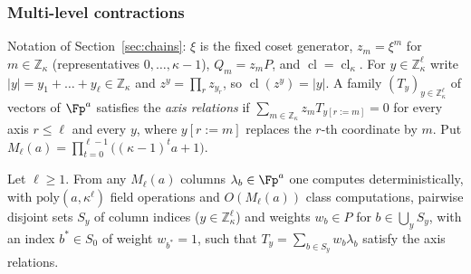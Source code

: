 
\subsubsection*{Multi-level contractions}

Notation of Section~\ref{sec:chains}: $\xi$ is the fixed coset generator, $z_m = \xi^m$ for $m \in \mathbb{Z}_\kappa$ (representatives $0,\dots,\kappa-1$), $Q_m = z_mP$, and $\operatorname{cl} = \operatorname{cl}_\kappa$. For $y \in \mathbb{Z}_\kappa^\ell$ write $|y| = y_1 + \dots + y_\ell \in \mathbb{Z}_\kappa$ and $z^y = \prod_r z_{y_r}$, so $\operatorname{cl}(z^y) = |y|$. A family $(T_y)_{y \in \mathbb{Z}_\kappa^\ell}$ of vectors of $\Fp^a$ satisfies the \emph{axis relations} if $\sum_{m \in \mathbb{Z}_\kappa} z_m T_{y[r := m]} = 0$ for every axis $r \le \ell$ and every $y$, where $y[r:=m]$ replaces the $r$-th coordinate by $m$. Put $M_\ell(a) = \prod_{t=0}^{\ell-1}\bigl((\kappa-1)^ta+1\bigr)$.

\begin{lemma}
\label{lem:ell-tensor}
Let $\ell \ge 1$. From any $M_\ell(a)$ columns $\lambda_b \in \Fp^a$ one computes deterministically, with $\mathrm{poly}(a,\kappa^\ell)$ field operations and $O(M_\ell(a))$ class computations, pairwise disjoint sets $S_y$ of column indices ($y \in \mathbb{Z}_\kappa^\ell$) and weights $w_b \in P$ for $b \in \bigcup_yS_y$, with an index $b^\ast \in S_0$ of weight $w_{b^\ast} = 1$, such that $T_y = \sum_{b \in S_y}w_b\lambda_b$ satisfy the axis relations.
\end{lemma}


